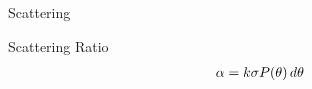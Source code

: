\documentclass[compress,red,12pt]{beamer}
\begin{document}



%
%
\begin{frame}{Scattering}
    \begin{overprint}
      {
        \centerline{\def\svgwidth{0.6\linewidth}\small{}}
      }
      {
        \centerline{\def\svgwidth{0.6\linewidth}\small{}}
      }
      {
        \centerline{\def\svgwidth{0.6\linewidth}\small{}}
      }
    \end{overprint}
    {
      \begin{center}{Scattering Ratio}
        \begin{align*}
          \alpha = k \sigma P(\theta) \,d{\theta}
        \end{align*}
      \end{center}
    }
\end{frame}

\end{document}
